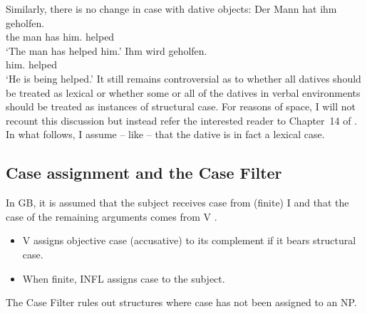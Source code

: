 Similarly, there is no change in case with dative objects:
\eal
\ex 
\gll Der Mann hat ihm geholfen.\\
     the man  has him.\dat{} helped\\
\glt `The man has helped him.'
\ex 
\gll Ihm        wird   geholfen.\\
     him.\dat{} \AUX{} helped\\
\glt `He is being helped.'
\zl
\addlines[-1]
It still remains controversial as to whether all datives should be treated as lexical or whether some or all of the datives in verbal environments should be treated as instances of structural case.
For reasons of space, I will not recount this discussion but instead refer the interested reader to Chapter~14 of .
In what follows, I assume -- like \citet[]{Haider86} -- that the dative is in fact a lexical case.



\subsection{Case assignment and the Case Filter}
\label{sec-case-assignment}

In GB, it is assumed that the subject receives case from (finite) I and
that the case of the remaining arguments comes from
V \parencites[]{Chomsky81a}[]{Haider84b}[--73]{FF87a}.
\begin{principle-break}\label{Kasusprinzip-GB}
\begin{itemize}
\item V assigns objective case (accusative) to its complement if it bears structural case.
\item When finite, INFL assigns case to the subject.
\end{itemize}
\end{principle-break}
The Case Filter rules out structures where case has not been assigned to an NP.

